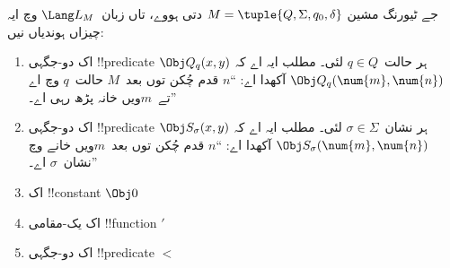\documentclass[../../../include/open-logic-section]{subfiles}
\begin{document}
\begin{defn}
جے ٹیورنگ مشین $M = \tuple{Q, \Sigma, q_0, \delta}$ دتی
ہووے، تاں زبان~$\Lang L_M$ وچ ایہ چیزاں ہوندیاں نیں:
\begin{enumerate}
\item اک دو-جگہی !!{predicate} $\Obj Q_q(x, y)$ ہر حالت~$q \in
  Q$ لئی۔ مطلب ایہ
  اے کہ $\Obj Q_q(\num{m}, \num{n})$ آکھدا اے: “$n$
  قدم چُکن توں بعد~$M$ حالت~$q$ وچ اے تے~$m$ویں خانہ
  پڑھ رہی اے۔”
\item اک دو-جگہی !!{predicate} $\Obj S_\sigma(x, y)$ ہر
  نشان~$\sigma\in \Sigma$ لئی۔ مطلب ایہ اے کہ $\Obj S_\sigma(\num{m},
  \num{n})$ آکھدا اے: “$n$ قدم چُکن توں بعد~$m$ویں خانے
  وچ نشان~$\sigma$ اے۔”
\item اک !!{constant} $\Obj 0$
\item اک یک-مقامی !!{function} $\prime$
\item اک دو-جگہی !!{predicate} $<$
\end{enumerate}
\end{defn}
\end{document}
